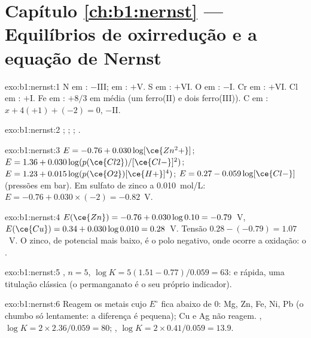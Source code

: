 \section*{Capítulo \ref{ch:b1:nernst} --- Equilíbrios de oxirredução e a equação de Nernst}

\begin{solution}{exo:b1:nernst:1}
N em : $-$III; em : $+$V. S em : $+$VI. O em
: $-$I. Cr em : $+$VI. Cl em : $+$I. Fe em
: $+8/3$ em média (um ferro(II) e dois ferro(III)). C em
: $x + 4(+1) + (-2) = 0$, $-$II.
\end{solution}

\begin{solution}{exo:b1:nernst:2}
;
;
;
.
\end{solution}

\begin{solution}{exo:b1:nernst:3}
$E = -0.76 + 0.030\log[\ce{Zn^2+}]$; $E = 1.36 + 0.030\log(p(\ce{Cl2})/[\ce{Cl-}]^2)$;
$E = 1.23 + 0.015\log(p(\ce{O2})[\ce{H+}]^4)$; $E = 0.27 - 0.059\log[\ce{Cl-}]$
(pressões em bar). Em sulfato de zinco a \qty{0.010}{mol/L}:
$E = -0.76 + 0.030 \times (-2) = -0.82$~V.
\end{solution}

\begin{solution}{exo:b1:nernst:4}
$E(\ce{Zn}) = -0.76 + 0.030\log 0.10 = -0.79$~V, $E(\ce{Cu}) = 0.34 +
0.030\log 0.010 = 0.28$~V. Tensão $0.28 - (-0.79) = 1.07$~V. O zinco, de
potencial mais baixo, é o polo negativo, onde ocorre a oxidação: o
.
\end{solution}

\begin{solution}{exo:b1:nernst:5}
, $n = 5$,
$\log K = 5(1.51 - 0.77)/0.059 = 63$:  e rápida, uma
titulação clássica (o permanganato é o seu próprio indicador).
\end{solution}

\begin{solution}{exo:b1:nernst:6}
Reagem os metais cujo $E^\circ$ fica abaixo de 0: Mg, Zn, Fe, Ni, Pb (o
chumbo só lentamente: a diferença é pequena); Cu e Ag não reagem. , $\log K = 2 \times 2.36/0.059 = 80$;
, $\log K = 2 \times 0.41/0.059 = 13.9$.
\end{solution}

